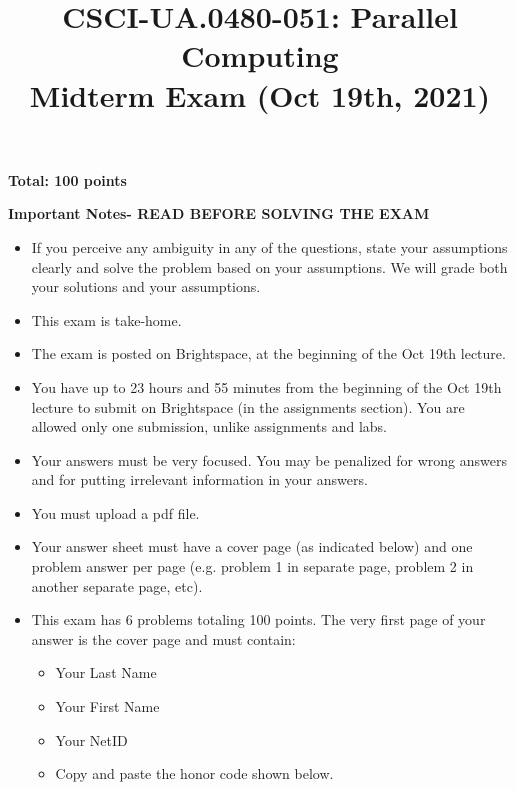 \documentclass{article}
\begin{document}
\title{CSCI-UA.0480-051: Parallel Computing \\ Midterm Exam (Oct 19th, 2021)}
\author{}
\date{}
\maketitle

\textbf{Total: 100 points}

\textbf{Important Notes- READ BEFORE SOLVING THE EXAM}
\begin{itemize}
    \item If you perceive any ambiguity in any of the questions, state your assumptions clearly and solve the problem based on your assumptions. We will grade both your solutions and your assumptions.
    \item This exam is take-home.
    \item The exam is posted on Brightspace, at the beginning of the Oct 19th lecture.
    \item You have up to 23 hours and 55 minutes from the beginning of the Oct 19th lecture to submit on Brightspace (in the assignments section). You are allowed only one submission, unlike assignments and labs.
    \item Your answers must be very focused. You may be penalized for wrong answers and for putting irrelevant information in your answers.
    \item You must upload a pdf file.
    \item Your answer sheet must have a cover page (as indicated below) and one problem answer per page (e.g. problem 1 in separate page, problem 2 in another separate page, etc).
    \item This exam has 6 problems totaling 100 points.  The very first page of your answer is the cover page and must contain:
    \begin{itemize}
        \item Your Last Name
        \item Your First Name
        \item Your NetID
        \item Copy and paste the honor code shown below.
    \end{itemize}
\end{itemize}
\end{document}
